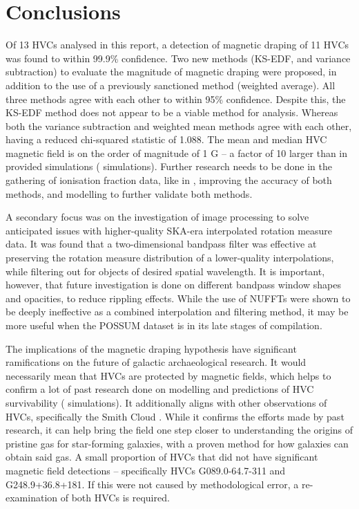 \chapter{Conclusions}
\label{cha:conclusion}

Of 13 HVCs analysed in this report, a detection of magnetic draping of 11 HVCs was found to within 99.9\% confidence. Two new methods (KS-EDF, and variance subtraction) to evaluate the magnitude of magnetic draping were proposed, in addition to the use of a previously sanctioned method (weighted average). All three methods agree with each other to within 95\% confidence. Despite this, the KS-EDF method does not appear to be a viable method for analysis. Whereas both the variance subtraction and weighted mean methods agree with each other, having a reduced chi-squared statistic of 1.088. The mean and median HVC magnetic field is on the order of magnitude of 1 \textmu G – a factor of 10 larger than in provided simulations (\citeauthor{ID23} simulations). Further research needs to be done in the gathering of ionisation fraction data, like in \cite{ID67}, improving the accuracy of both methods, and modelling to further validate both methods.

A secondary focus was on the investigation of image processing to solve anticipated issues with higher-quality SKA-era interpolated rotation measure data. It was found that a two-dimensional bandpass filter was effective at preserving the rotation measure distribution of a lower-quality interpolations, while filtering out for objects of desired spatial wavelength. It is important, however, that future investigation is done on different bandpass window shapes and opacities, to reduce rippling effects. While the use of NUFFTs were shown to be deeply ineffective as a combined interpolation and filtering method, it may be more useful when the POSSUM dataset is in its late stages of compilation.

The implications of the magnetic draping hypothesis have significant ramifications on the future of galactic archaeological research. It would necessarily mean that HVCs are protected by magnetic fields, which helps to confirm a lot of past research done on modelling and predictions of HVC survivability (\citeauthor{ID23} simulations). It additionally aligns with other observations of HVCs, specifically the Smith Cloud \citep{ID5, ID26}. While it confirms the efforts made by past research, it can help bring the field one step closer to understanding the origins of pristine gas for star-forming galaxies, with a proven method for how galaxies can obtain said gas. A small proportion of HVCs that did not have significant magnetic field detections – specifically HVCs G089.0-64.7-311 and G248.9+36.8+181. If this were not caused by methodological error, a re-examination of both HVCs is required.

